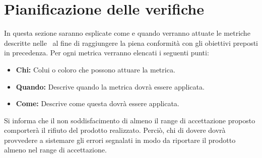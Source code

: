 \section{Pianificazione delle verifiche}
In questa sezione saranno esplicate come e quando verranno attuate le metriche descritte nelle \NdP\ al fine di raggiungere la piena conformità con gli obiettivi preposti in precedenza.
Per ogni metrica verranno elencati i seguenti punti:
\begin{itemize}
\item \textbf{Chi:} Colui o coloro che possono attuare la metrica.
\item \textbf{Quando:} Descrive quando la metrica dovrà essere applicata.
\item \textbf{Come:} Descrive come questa dovrà essere applicata.
\end{itemize}

Si informa che il non soddisfacimento di almeno il range di accettazione proposto comporterà il rifiuto del prodotto realizzato. Perciò, chi di dovere dovrà provvedere a sistemare gli errori segnalati in modo da riportare il prodotto almeno nel range di accettazione. 




